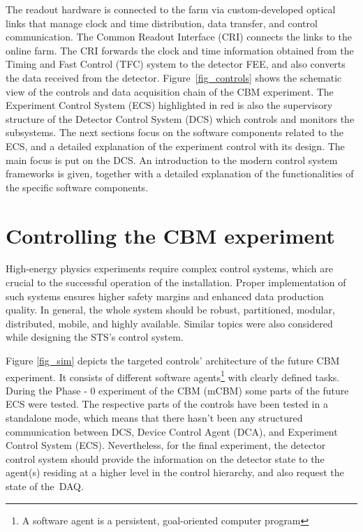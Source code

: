 \newpage
The readout hardware is connected to the farm via custom-developed optical links that manage clock and time distribution, data transfer, and control communication. The Common Readout Interface (\gls{CRI}) connects the links to the online farm. The \gls{CRI} forwards the clock and time information obtained from the Timing and Fast Control (\gls{TFC}) system to the detector \gls{FEE}, and also converts the data received from the detector. Figure~\ref{fig_controls} shows the schematic view of the controls and data acquisition chain of the \gls{CBM} experiment. The Experiment Control System (\gls{ECS}) highlighted in red is also the supervisory structure of the Detector Control System (\gls{DCS}) which controls and monitors the subsystems. The next sections focus on the software components related to the \gls{ECS}, and a detailed explanation of the experiment control with its design. The main focus is put on the \gls{DCS}. An introduction to the modern control system frameworks is given, together with a detailed explanation of the functionalities of the specific software components. 
\section{Controlling the CBM experiment}

High-energy physics experiments require complex control systems, which are crucial to the successful operation of the installation. Proper implementation of such systems ensures higher safety margins and enhanced data production quality. In general, the whole system should be robust, partitioned, modular, distributed, mobile, and highly available. Similar topics were also considered while designing the \gls{STS}'s control system.

Figure \ref{fig_sim} depicts the targeted controls' architecture of the future \gls{CBM} experiment. It consists of different software agents\footnote{A software agent is a persistent, goal-oriented computer program} with clearly defined tasks. During the Phase - 0 experiment of the \gls{CBM} (\gls{mCBM}) some parts of the future \gls{ECS} were tested. The respective parts of the controls have been tested in a standalone mode, which means that there hasn't been any structured communication between \gls{DCS}, Device Control Agent (\gls{DCA}), and Experiment Control System (\gls{ECS}). Nevertheless, for the final experiment, the detector control system should provide the information on the detector state to the agent(s) residing at a higher level in the control hierarchy, and also request the state of the~\gls{DAQ}.

